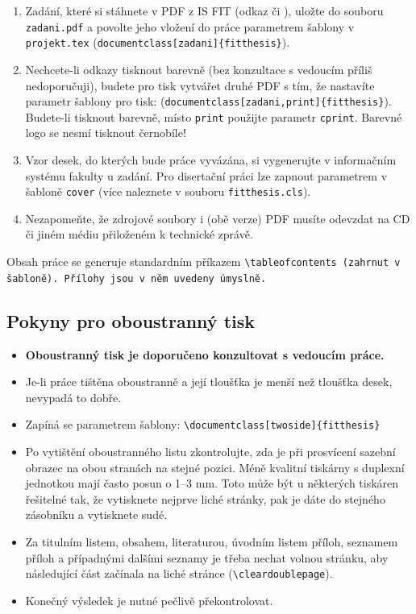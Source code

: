 \begin{enumerate}
  \item Zadání, které si stáhnete v PDF z IS FIT (odkaz  či ), uložte do souboru \texttt{zadani.pdf} a povolte jeho vložení do práce parametrem šablony v \texttt{projekt.tex} (\verb|document|\verb|class[zadani]{fitthesis}|).
  \item Nechcete-li odkazy tisknout barevně (bez konzultace s vedoucím příliš nedoporučuji), budete pro tisk vytvářet druhé PDF s tím, že nastavíte parametr šablony pro tisk: (\verb|document|\verb|class[zadani,print]{fitthesis}|). Budete-li tisknout barevně, místo \texttt{print} použijte parametr \texttt{cprint}. Barevné logo se nesmí tisknout černobíle!
  \item Vzor desek, do kterých bude práce vyvázána, si vygenerujte v informačním systému fakulty u zadání. Pro disertační práci lze zapnout parametrem v šabloně \texttt{cover} (více naleznete v souboru \texttt{fitthesis.cls}).
  \item Nezapomeňte, že zdrojové soubory i (obě verze) PDF musíte odevzdat na CD či jiném médiu přiloženém k technické zprávě.
\end{enumerate}

Obsah práce se generuje standardním příkazem \tt \textbackslash tableofcontents \rm (zahrnut v šabloně). Přílohy jsou v něm uvedeny úmyslně.

\subsection*{Pokyny pro oboustranný tisk}
\begin{itemize}
\item \textbf{Oboustranný tisk je doporučeno konzultovat s vedoucím práce.}
\item Je-li práce tištěna oboustranně a její tloušťka je menší než tloušťka desek, nevypadá to dobře.
\item Zapíná se parametrem šablony: \verb|\document|\verb|class[twoside]{fitthesis}|
\item Po vytištění oboustranného listu zkontrolujte, zda je při prosvícení sazební obrazec na obou stranách na stejné pozici. Méně kvalitní tiskárny s duplexní jednotkou mají často posun o 1--3 mm. Toto může být u některých tiskáren řešitelné tak, že vytisknete nejprve liché stránky, pak je dáte do stejného zásobníku a vytisknete sudé.
\item Za titulním listem, obsahem, literaturou, úvodním listem příloh, seznamem příloh a případnými dalšími seznamy je třeba nechat volnou stránku, aby následující část začínala na liché stránce (\texttt{\textbackslash cleardoublepage}).
\item  Konečný výsledek je nutné pečlivě překontrolovat.
\end{itemize}

